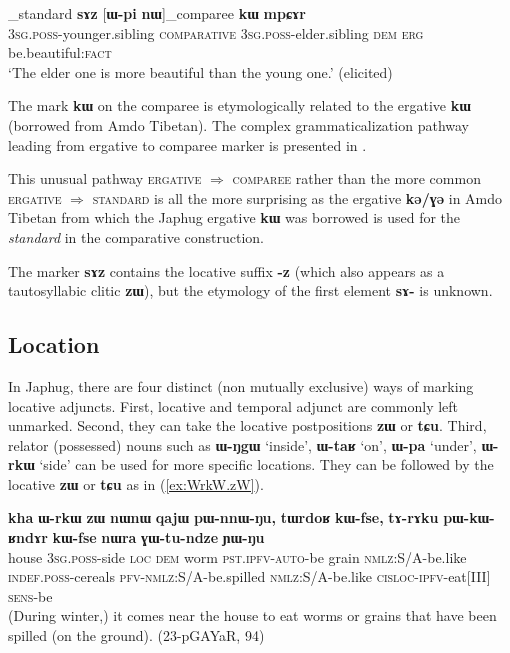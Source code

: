 \documentclass[oldfontcommands,oneside,a4paper,11pt]{article}
\newcommand{\ipa}[1]{\mbox{\phon\textbf{#1}}} %
\begin{document}
\begin{exe}
\ex \label{ex:comp1}
\gll  [\ipa{ɯ-ʁi}]_{standard}   	\ipa{sɤz}   	[\ipa{ɯ-pi}   	\ipa{nɯ}]_{comparee}   	\ipa{\textbf{kɯ}}   	\ipa{mpɕɤr}     \\
\textsc{3sg.poss}-younger.sibling \textsc{comparative} \textsc{3sg.poss}-elder.sibling \textsc{dem} \textsc{erg}  be.beautiful:\textsc{fact} \\
\glt `The elder one is more beautiful than the young one.' (elicited)
\end{exe}

The mark \ipa{kɯ} on the comparee is etymologically related to the ergative \ipa{kɯ} (borrowed from Amdo Tibetan). The complex grammaticalization pathway leading from ergative to comparee marker is presented in \citet{jacques16comparative}. 

This unusual pathway \textsc{ergative} $\Rightarrow$ \textsc{comparee} rather than the more common \textsc{ergative} $\Rightarrow$ \textsc{standard} is all the more surprising as the ergative \ipa{kə/ɣə} in Amdo Tibetan from which the Japhug ergative \ipa{kɯ} was borrowed is used for the \textit{standard} in the comparative construction.

The marker \ipa{sɤz} contains the locative suffix \ipa{-z} (which also appears as a tautosyllabic clitic \ipa{zɯ}), but the etymology of the first element \ipa{sɤ-} is unknown. 

 \subsection{Location}   \label{sec:loc}
In Japhug, there are four distinct (non mutually exclusive) ways of marking locative adjuncts. First, locative and temporal adjunct are commonly left unmarked. Second, they can  take the locative postpositions \ipa{zɯ} or \ipa{tɕu}.  Third, relator (possessed) nouns such as \ipa{ɯ-ŋgɯ} `inside', \ipa{ɯ-taʁ} `on', \ipa{ɯ-pa} `under', \ipa{ɯ-rkɯ} `side' can be used for more specific locations. They can be followed by the locative \ipa{zɯ} or \ipa{tɕu} as in (\ref{ex:WrkW.zW}).

\begin{exe}
\ex \label{ex:WrkW.zW}
\gll \ipa{kha} 	\ipa{ɯ-rkɯ} 	\ipa{zɯ} 	\ipa{nɯnɯ} 	\ipa{qajɯ} 	\ipa{pɯ-nnɯ-ŋu,} 	\ipa{tɯrdoʁ} 	\ipa{kɯ-fse,} 	\ipa{tɤ-rɤku} 	\ipa{pɯ-kɯ-ʁndɤr} 	\ipa{kɯ-fse} 	\ipa{nɯra} 	\ipa{ɣɯ-tu-ndze} 	\ipa{ɲɯ-ŋu} \\
house \textsc{3sg.poss}-side \textsc{loc} \textsc{dem} worm \textsc{pst.ipfv-auto}-be grain \textsc{nmlz}:S/A-be.like \textsc{indef.poss}-cereals \textsc{pfv-nmlz}:S/A-be.spilled \textsc{nmlz}:S/A-be.like \textsc{cisloc-ipfv}-eat[III] \textsc{sens}-be \\
\glt (During winter,) it comes near the house to eat worms or grains that have been spilled (on the ground). (23-pGAYaR, 94)
\end{exe}
\end{document}
